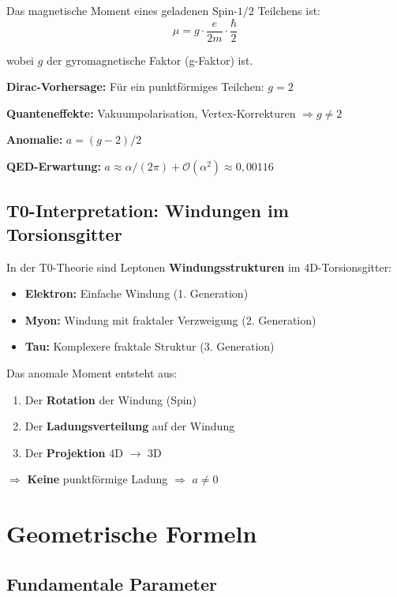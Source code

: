 	Das magnetische Moment eines geladenen Spin-$1/2$ Teilchens ist:
	\begin{equation}
		\mu = g \cdot \frac{e}{2m} \cdot \frac{\hbar}{2}
	\end{equation}
	
	wobei $g$ der gyromagnetische Faktor (g-Faktor) ist.
	
	\textbf{Dirac-Vorhersage:} Für ein punktförmiges Teilchen: $g = 2$
	
	\textbf{Quanteneffekte:} Vakuumpolarisation, Vertex-Korrekturen $\Rightarrow g \neq 2$
	
	\textbf{Anomalie:} $a = (g-2)/2$
	
	\textbf{QED-Erwartung:} $a \approx \alpha/(2\pi) + \mathcal{O}(\alpha^2) \approx 0{,}00116$
	
	\subsection{T0-Interpretation: Windungen im Torsionsgitter}
	
	In der T0-Theorie sind Leptonen \textbf{Windungsstrukturen} im 4D-Torsionsgitter:
	
	\begin{itemize}
		\item \textbf{Elektron:} Einfache Windung (1. Generation)
		\item \textbf{Myon:} Windung mit fraktaler Verzweigung (2. Generation)
		\item \textbf{Tau:} Komplexere fraktale Struktur (3. Generation)
	\end{itemize}
	
	Das anomale Moment entsteht aus:
	\begin{enumerate}
		\item Der \textbf{Rotation} der Windung (Spin)
		\item Der \textbf{Ladungsverteilung} auf der Windung
		\item Der \textbf{Projektion} 4D $\to$ 3D
	\end{enumerate}
	
	$\Rightarrow$ \textbf{Keine} punktförmige Ladung $\Rightarrow$ $a \neq 0$
	
	\section{Geometrische Formeln}
	
	\subsection{Fundamentale Parameter}
	
